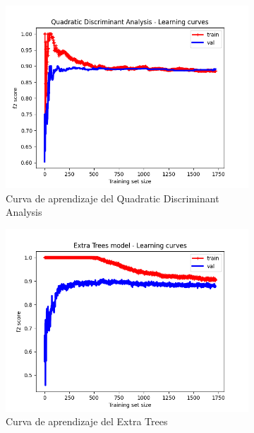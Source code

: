 \begin{figure}[!ht]
\begin{subfigure}[b]{0.3\textwidth}
        \includegraphics[width=\linewidth]{media/images/learning-curves/qda.png}
        \caption{Curva de aprendizaje del Quadratic Discriminant Analysis}
        \label{sfig:lc-qda}
    \end{subfigure}
    \begin{subfigure}[b]{0.3\textwidth}
        \includegraphics[width=\linewidth]{media/images/learning-curves/et.png}
        \caption{Curva de aprendizaje del Extra Trees}
        \label{sfig:lc-et}
    \end{subfigure}
    \begin{subfigure}[b]{0.3\textwidth}

\end{subfigure}
\end{figure}
